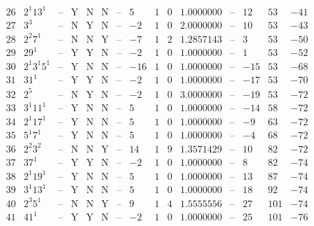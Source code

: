 \documentclass[11pt,reqno,a4letter]{article}
\numberwithin{figure}{section}
\numberwithin{table}{section}
\theoremstyle{plain}
\numberwithin{theorem}{section}
\theoremstyle{definition}
\begin{document}
\begin{table}[h!]
\begin{equation*}
{\begin{array}{|cc|c|ccc|c|c|ccc|c|ccc}
 26 & 2^1 13^1 & \text{--} & \text{Y} & \text{N} & \text{N} & \text{--} & 5 & 1 & 0 & 1.0000000 & \text{--} & 12 & 53 & -41 \\
 27 & 3^3 & \text{--} & \text{N} & \text{Y} & \text{N} & \text{--} & -2 & 1 & 0 & 2.0000000 & \text{--} & 10 & 53 & -43 \\
 28 & 2^2 7^1 & \text{--} & \text{N} & \text{N} & \text{Y} & \text{--} & -7 & 1 & 2 & 1.2857143 & \text{--} & 3 & 53 & -50 \\
 29 & 29^1 & \text{--} & \text{Y} & \text{Y} & \text{N} & \text{--} & -2 & 1 & 0 & 1.0000000 & \text{--} & 1 & 53 & -52 \\
 30 & 2^1 3^1 5^1 & \text{--} & \text{Y} & \text{N} & \text{N} & \text{--} & -16 & 1 & 0 & 1.0000000 & \text{--} & -15 & 53 & -68 \\
 31 & 31^1 & \text{--} & \text{Y} & \text{Y} & \text{N} & \text{--} & -2 & 1 & 0 & 1.0000000 & \text{--} & -17 & 53 & -70 \\
 32 & 2^5 & \text{--} & \text{N} & \text{Y} & \text{N} & \text{--} & -2 & 1 & 0 & 3.0000000 & \text{--} & -19 & 53 & -72 \\
 33 & 3^1 11^1 & \text{--} & \text{Y} & \text{N} & \text{N} & \text{--} & 5 & 1 & 0 & 1.0000000 & \text{--} & -14 & 58 & -72 \\
 34 & 2^1 17^1 & \text{--} & \text{Y} & \text{N} & \text{N} & \text{--} & 5 & 1 & 0 & 1.0000000 & \text{--} & -9 & 63 & -72 \\
 35 & 5^1 7^1 & \text{--} & \text{Y} & \text{N} & \text{N} & \text{--} & 5 & 1 & 0 & 1.0000000 & \text{--} & -4 & 68 & -72 \\
 36 & 2^2 3^2 & \text{--} & \text{N} & \text{N} & \text{Y} & \text{--} & 14 & 1 & 9 & 1.3571429 & \text{--} & 10 & 82 & -72 \\
 37 & 37^1 & \text{--} & \text{Y} & \text{Y} & \text{N} & \text{--} & -2 & 1 & 0 & 1.0000000 & \text{--} & 8 & 82 & -74 \\
 38 & 2^1 19^1 & \text{--} & \text{Y} & \text{N} & \text{N} & \text{--} & 5 & 1 & 0 & 1.0000000 & \text{--} & 13 & 87 & -74 \\
 39 & 3^1 13^1 & \text{--} & \text{Y} & \text{N} & \text{N} & \text{--} & 5 & 1 & 0 & 1.0000000 & \text{--} & 18 & 92 & -74 \\
 40 & 2^3 5^1 & \text{--} & \text{N} & \text{N} & \text{Y} & \text{--} & 9 & 1 & 4 & 1.5555556 & \text{--} & 27 & 101 & -74 \\
 41 & 41^1 & \text{--} & \text{Y} & \text{Y} & \text{N} & \text{--} & -2 & 1 & 0 & 1.0000000 & \text{--} & 25 & 101 & -76 \\

\end{array}}
\end{equation*}
\end{table}
\end{document}
